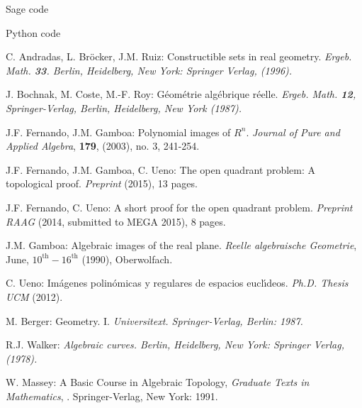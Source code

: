 \documentclass[11pt, a4paper, english, twoside, notitlepage, openright]{report}
\begin{document}
\begin{chapter}{Sage code}

\end{chapter}

\begin{chapter}{Python code}

\end{chapter}

\begin{thebibliography}{ABR}

 C. Andradas, L. Br\"ocker, J.M. Ruiz: Constructible 
sets in real geometry. \em Ergeb. Math. \em{\bf 33}. Berlin, Heidelberg, 
New York: Springer Verlag, (1996).

 J. Bochnak, M. Coste, M.-F. Roy: G\'eom\'etrie
alg\'ebrique r\'eelle. \em Ergeb. Math. \em {\bf 12}, Springer-Verlag,
Berlin, Heidelberg, New York (1987).

 J.F. Fernando, J.M. Gamboa: Polynomial images of $R^n$.
\textit{Journal of Pure and Applied Algebra}, {\bf 179}, (2003), no. 3, 241-254.

 J.F. Fernando, J.M. Gamboa, C. Ueno: The open quadrant problem:
A topological proof. \textit{Preprint} (2015), 13 pages.

 J.F. Fernando, C. Ueno: A short proof for the open quadrant problem.
\textit{Preprint RAAG} (2014, submitted to MEGA 2015), 8 pages.

 J.M. Gamboa: Algebraic images of the real plane. \textit{Reelle algebraische Geometrie}, June,
$10^{\text{th}}-16^{\text{th}}$ (1990), Oberwolfach.

 C. Ueno: Im\'agenes polin\'omicas y regulares de espacios eucl\'\i deos. {\em Ph.D. Thesis UCM} (2012).

 M. Berger: Geometry. I. \em Universitext\em. Springer-Verlag, Berlin: 1987.

 R.J. Walker: \em Algebraic curves. \em Berlin, Heidelberg, 
New York: Springer Verlag, (1978).

 W. Massey: A Basic Course in Algebraic Topology, \emph{Graduate Texts in Mathematics}, \textbf{}.
Springer-Verlag, New York: 1991.



\end{thebibliography}
\end{document}
